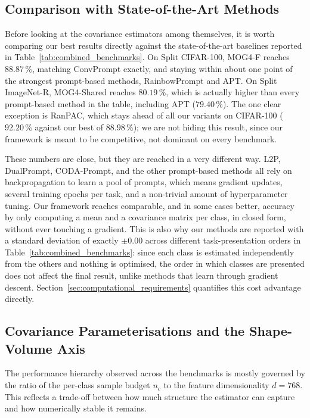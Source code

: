 \subsection{Comparison with State-of-the-Art Methods}
\label{sec:an:sota_comparison}

Before looking at the covariance estimators among themselves, it is worth comparing our best results directly against the state-of-the-art baselines reported in Table~\ref{tab:combined_benchmarks}. On Split CIFAR-100, MOG4-F reaches  $88.87\,\%$, matching ConvPrompt exactly, and staying within about one point of the strongest prompt-based methods, RainbowPrompt and APT. On Split ImageNet-R, MOG4-Shared reaches $80.19\,\%$, which is actually higher than every prompt-based method in the table, including APT ($79.40\,\%$). The one clear exception is RanPAC, which stays ahead of all our variants on CIFAR-100 ($92.20\,\%$ against our best of $88.98\,\%$); we are not hiding this result, since our framework is meant to be competitive, not dominant on every benchmark.

These numbers are close, but they are reached in a very different way. L2P, DualPrompt, CODA-Prompt, and the other prompt-based methods all rely on backpropagation to learn a pool of prompts, which means gradient updates, several training epochs per task, and a non-trivial amount of hyperparameter tuning. Our framework reaches comparable, and in some cases better, accuracy by only computing a mean and a covariance matrix per class, in closed form, without ever touching a gradient. This is also why our methods are reported with a standard deviation of exactly $\pm 0.00$ across different task-presentation orders in Table~\ref{tab:combined_benchmarks}: since each class is estimated independently from the others and nothing is optimised, the order in which classes are presented does not affect the final result, unlike methods that learn through gradient descent. Section~\ref{sec:computational_requirements} quantifies this cost advantage directly.

\subsection{Covariance Parameterisations and the Shape-Volume Axis}
\label{sec:an:covariance_mechanics}

The performance hierarchy observed across the benchmarks is mostly governed by the ratio of the per-class sample budget $n_c$ to the feature dimensionality $d=768$. This reflects a trade-off between how much structure the estimator can capture and how numerically stable it remains.


